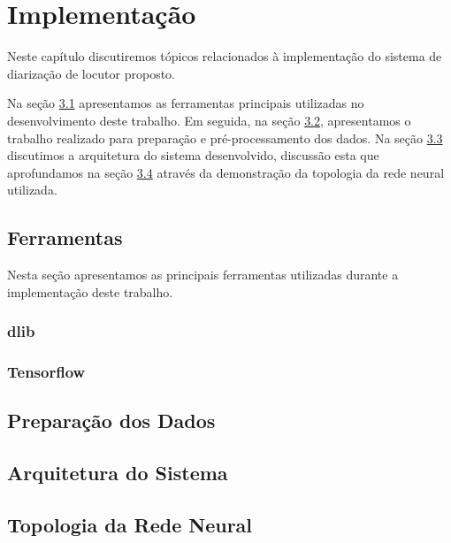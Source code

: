 \chapter{Implementação}

Neste capítulo discutiremos tópicos relacionados à implementação do sistema de diarização de locutor proposto. 

Na seção \hyperlink{section.3.1}{3.1} apresentamos as ferramentas principais utilizadas no desenvolvimento deste trabalho. Em seguida, na seção \hyperlink{section.3.2}{3.2}, apresentamos o trabalho realizado para preparação e pré-processamento dos dados. Na seção \hyperlink{section.3.3}{3.3} discutimos a arquitetura do sistema desenvolvido, discussão esta que aprofundamos na seção \hyperlink{section.3.4}{3.4} através da demonstração da topologia da rede neural utilizada.

\section{Ferramentas}

Nesta seção apresentamos as principais ferramentas utilizadas durante a implementação deste trabalho.

\subsection{dlib}

\subsection{Tensorflow}

\section{Preparação dos Dados}

\section{Arquitetura do Sistema}

\section{Topologia da Rede Neural}